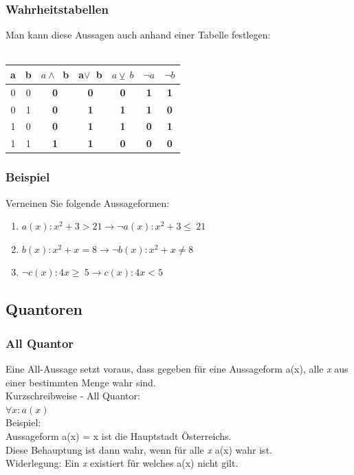 \documentclass{article}
\begin{document}
	\subsubsection{Wahrheitstabellen}
	Man kann diese Aussagen auch anhand einer Tabelle festlegen: \\ \\ 
	\begin{tabular}{| c | c | c | c | c | c | c |}
		\toprule
		a & b & $a \land\ $  b & a$ \lor\ $  b & $a \veebar\  b$ & $\neg a$ & $\neg b$ \\ \midrule
		0 & 0 & \textbf{0} & \textbf{0} & \textbf{0} & \textbf{1} & \textbf{1} \\ \hline
		0 & 1 & \textbf{0} & \textbf{1} & \textbf{1} & \textbf{1} & \textbf{0} \\ \hline
		1 & 0 & \textbf{0} & \textbf{1} & \textbf{1} & \textbf{0} & \textbf{1} \\ \hline
		1 & 1 & \textbf{1} & \textbf{1} & \textbf{0} & \textbf{0} & \textbf{0} \\
		\bottomrule
	\end{tabular}
	\subsubsection{Beispiel}
	Verneinen Sie folgende Aussageformen:
	\begin{enumerate}
		\item{$a(x): x^2 + 3 > 21 \to \neg a(x):x^2+3 \leq\ 21$}
		\item{$b(x): x^2 + x = 8 \to \neg b(x): x^2+x \neq 8$}
		\item{$\neg c(x): 4x \geq\ 5 \to c(x): 4x < 5$}
	\end{enumerate}

	\subsection{Quantoren}
	\subsubsection{All Quantor}
	Eine All-Aussage setzt voraus, dass gegeben für eine Aussageform a(x), alle \textit{x} aus einer bestimmten Menge wahr sind. \\
	Kurzschreibweise - All Quantor: \\
	$\forall x:a(x)$ \\
	Beispiel:\\
	Aussageform a(x) = x ist die Hauptstadt Österreichs. \\
	Diese Behauptung ist dann wahr, wenn für alle \textit{x} a(x) wahr ist. \\
	Widerlegung: Ein \textit{x} existiert für welches a(x) nicht gilt.
\end{document}
